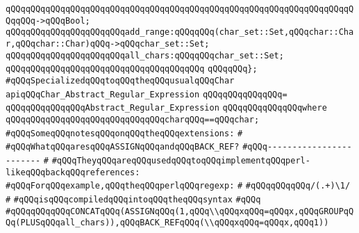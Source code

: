 \verb|qQQqqQQqqQQqqQQqqQQqqQQqqQQqqQQqqQQqqQQqqQQqqQQqqQQqqQQqqQQqqQQqqQQqqQQqqQQq->qQQqBool;|\newline
\newline
\verb|qQQqqQQqqQQqqQQqqQQqqQQqadd_range:qQQqqQQq(char_set::Set,qQQqchar::Char,qQQqchar::Char)qQQq->qQQqchar_set::Set;|\newline
\verb|qQQqqQQqqQQqqQQqqQQqqQQqall_chars:qQQqqQQqchar_set::Set;|\newline
\verb|qQQqqQQqqQQqqQQqqQQqqQQqqQQqqQQqqQQqqQQq|\newline
\verb|qQQqqQQq};|\newline
\newline
\verb|#qQQqSpecializedqQQqtoqQQqtheqQQqusualqQQqChar|\newline
\newline
\verb|apiqQQqChar_Abstract_Regular_Expression|\newline
\verb|qQQqqQQqqQQqqQQq=|\newline
\verb|qQQqqQQqqQQqqQQqAbstract_Regular_Expression|\newline
\verb|qQQqqQQqqQQqqQQqwhere|\newline
\verb|qQQqqQQqqQQqqQQqqQQqqQQqqQQqqQQqcharqQQq==qQQqchar;|\newline
\newline
\newline
\newline
\verb|#qQQqSomeqQQqnotesqQQqonqQQqtheqQQqextensions:|\newline
\verb|#|\newline
\verb|#qQQqWhatqQQqaresqQQqASSIGNqQQqandqQQqBACK_REF?|\newline
\verb|#qQQq------------------------|\newline
\verb|#|\newline
\verb|#qQQqTheyqQQqareqQQqusedqQQqtoqQQqimplementqQQqperl-likeqQQqbackqQQqreferences:|\newline
\verb|#qQQqForqQQqexample,qQQqtheqQQqperlqQQqregexp:|\newline
\verb|#|\newline
\verb|#qQQqqQQqqQQq/(.+)\1/|\newline
\verb|#|\newline
\verb|#qQQqisqQQqcompiledqQQqintoqQQqtheqQQqsyntax|\newline
\verb|#qQQq|\newline
\verb|#qQQqqQQqqQQqCONCATqQQq(ASSIGNqQQq(1,qQQq\\qQQqxqQQq=qQQqx,qQQqGROUPqQQq(PLUSqQQqall_chars)),qQQqBACK_REFqQQq(\\qQQqxqQQq=qQQqx,qQQq1))|\newline
